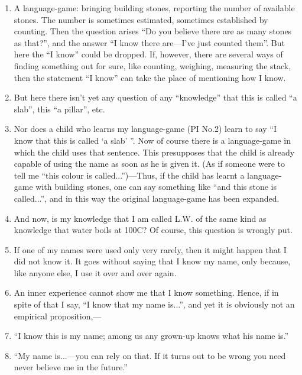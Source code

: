 \documentclass{book}
\begin{document}
\begin{enumerate}
\item
A language-game: bringing building stones, reporting the number of available
stones. The number is sometimes estimated, sometimes established by counting.
Then the question arises ``Do you believe there are as many stones as that?'',
and the answer ``I know there are---I've just counted them''. But here the ``I
know'' could be dropped. If, however, there are several ways of finding
something out for sure, like counting, weighing, measuring the stack, then the
statement ``I know'' can take the place of mentioning how I know.

\item
But here there isn't yet any question of any ``knowledge'' that this is called
``a slab'', this ``a pillar'', etc.

\item
Nor does a child who learns my language-game (PI No.2) learn to say ``I know
that this is called `a slab' ''.  Now of course there is a language-game in
which the child uses that sentence. This presupposes that the child is already
capable of using the name as soon as he is given it. (As if someone were to
tell me ``this colour is called...'')---Thus, if the child has learnt a
language-game with building stones, one can say something like ``and this stone
is called...'', and in this way the original language-game has been expanded.

\item
And now, is my knowledge that I am called L.W. of the same kind as knowledge
that water boils at 100C? Of course, this question is wrongly put.

\item
If one of my names were used only very rarely, then it might happen that I did
not know it. It goes without saying that I know my name, only because, like
anyone else, I use it over and over again.

\item
An inner experience cannot show me that I know something.  Hence, if in spite
of that I say, ``I know that my name is...'', and yet it is obviously not an
empirical proposition,---

\item
``I know this is my name; among us any grown-up knows what his name is.''

\item
``My name is...---you can rely on that. If it turns out to be wrong you need
never believe me in the future.''


\end{enumerate}
\end{document}
